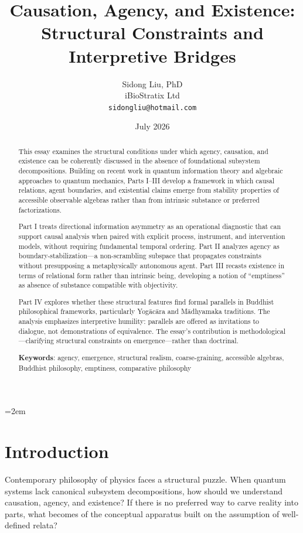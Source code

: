 \documentclass[11pt,a4paper]{article}
\title{Causation, Agency, and Existence:\\
Structural Constraints and Interpretive Bridges}
\author{
  Sidong Liu, PhD \\
  iBioStratix Ltd \\
  \texttt{sidongliu@hotmail.com}
}
\date{July 2026}
\begin{document}
\emergencystretch=2em
\raggedbottom
{}

\maketitle

\begin{abstract}
This essay examines the structural conditions under which agency, causation, and existence can be coherently discussed in the absence of foundational subsystem decompositions. Building on recent work in quantum information theory and algebraic approaches to quantum mechanics, Parts I--III develop a framework in which causal relations, agent boundaries, and existential claims emerge from stability properties of accessible observable algebras rather than from intrinsic substance or preferred factorizations.

Part I treats directional information asymmetry as an operational diagnostic that can support causal analysis when paired with explicit process, instrument, and intervention models, without requiring fundamental temporal ordering. Part II analyzes agency as boundary-stabilization—a non-scrambling subspace that propagates constraints without presupposing a metaphysically autonomous agent. Part III recasts existence in terms of relational form rather than intrinsic being, developing a notion of ``emptiness'' as absence of substance compatible with objectivity.

Part IV explores whether these structural features find formal parallels in Buddhist philosophical frameworks, particularly Yog\=ac\=ara and M\=adhyamaka traditions. The analysis emphasizes interpretive humility: parallels are offered as invitations to dialogue, not demonstrations of equivalence. The essay's contribution is methodological—clarifying structural constraints on emergence—rather than doctrinal.

\medskip

\noindent\textbf{Keywords}: agency, emergence, structural realism, coarse-graining, accessible algebras, Buddhist philosophy, emptiness, comparative philosophy
\end{abstract}

\tableofcontents

\section{Introduction}
\label{sec:intro}

Contemporary philosophy of physics faces a structural puzzle. When quantum systems lack canonical subsystem decompositions, how should we understand causation, agency, and existence? If there is no preferred way to carve reality into parts, what becomes of the conceptual apparatus built on the assumption of well-defined relata?
\end{document}
